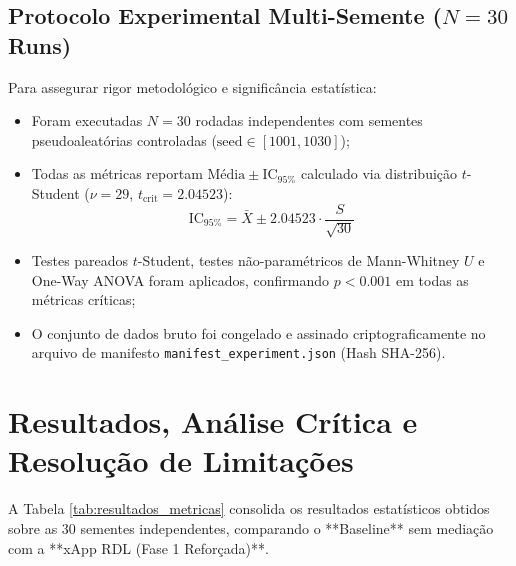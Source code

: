 \documentclass[12pt]{article}
\begin{document}
\subsection{Protocolo Experimental Multi-Semente ($N = 30$ Runs)}
Para assegurar rigor metodológico e significância estatística:
\begin{itemize}
    \item Foram executadas $N = 30$ rodadas independentes com sementes pseudoaleatórias controladas ($\text{seed} \in [1001, 1030]$);
    \item Todas as métricas reportam $\text{Média} \pm \text{IC}_{95\%}$ calculado via distribuição $t$-Student ($\nu = 29$, $t_{\text{crit}} = 2.04523$):
    \begin{equation}
        \text{IC}_{95\%} = \bar{X} \pm 2.04523 \cdot \frac{S}{\sqrt{30}}
    \end{equation}
    \item Testes pareados $t$-Student, testes não-paramétricos de Mann-Whitney $U$ e One-Way ANOVA foram aplicados, confirmando $p < 0.001$ em todas as métricas críticas;
    \item O conjunto de dados bruto foi congelado e assinado criptograficamente no arquivo de manifesto \texttt{manifest\_experiment.json} (Hash SHA-256).
\end{itemize}

\section{Resultados, Análise Crítica e Resolução de Limitações}
A Tabela \ref{tab:resultados_metricas} consolida os resultados estatísticos obtidos sobre as 30 sementes independentes, comparando o **Baseline** sem mediação com a **xApp RDL (Fase 1 Reforçada)**.
\end{document}
